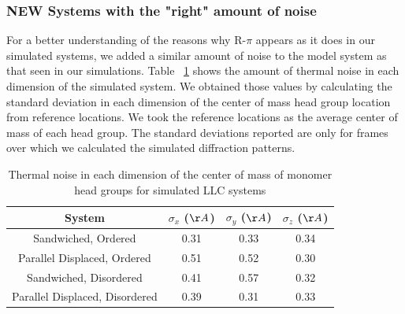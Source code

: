 \documentclass{article}
\begin{document}
  \subsubsection{\textbf{NEW} Systems with the "right" amount of noise}

  For a better understanding of the reasons why R-$\pi$ appears as it does in
  our simulated systems, we added a similar amount of noise to the model system
  as that seen in our simulations. Table ~\ref{table:simulation_noise} shows the
  amount of thermal noise in each dimension of the simulated system. We obtained
  those values by calculating the standard deviation in each dimension of the
  center of mass head group location from reference locations. We took the
  reference locations as the average center of mass of each head group. The
  standard deviations reported are only for frames over which we calculated the
  simulated diffraction patterns. 

  \begin{table}
  \centering
  \begin{tabular}{c c c c}
  \toprule
  System                         &   $\sigma_x$ ($\AA$) &   $\sigma_y$ ($\AA$) & $\sigma_z$ ($\AA$) \\
  \midrule
  Sandwiched, Ordered            &      0.31            &     0.33             &     0.34           \\
  Parallel Displaced, Ordered    &      0.51            &     0.52             &     0.30           \\
  Sandwiched, Disordered         &      0.41            &     0.57             &     0.32           \\
  Parallel Displaced, Disordered &      0.39            &     0.31             &     0.33           \\
  \bottomrule
  \end{tabular}
  \caption{Thermal noise in each dimension of the center of mass of monomer head groups for 
  simulated LLC systems}\label{table:simulation_noise}
  \end{table}
\end{document}
